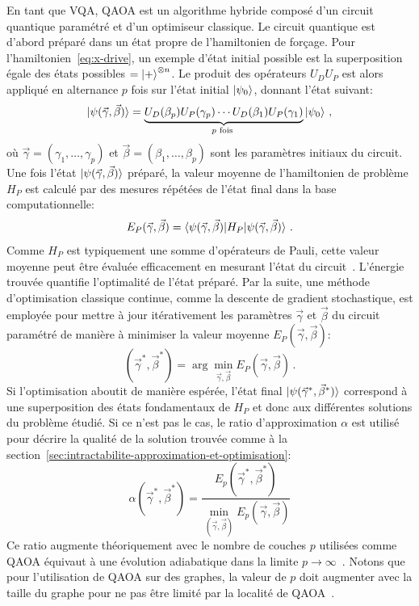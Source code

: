 En tant que VQA, QAOA est un algorithme hybride composé d'un circuit quantique paramétré et d'un optimiseur classique. Le circuit quantique est d'abord préparé dans un état propre de l'hamiltonien de forçage. Pour l'hamiltonien~\ref{eq:x-drive}, un exemple d'état initial possible est la superposition égale des états possibles $= \ket{+}^{\otimes n}$. Le produit des opérateurs $U_{D}U_{P}$ est alors appliqué en alternance $p$ fois sur l'état initial $\ket{\psi_{0}}$, donnant l'état suivant:
\begin{equation}
    \label{eq:final-state}
    \ket{\psi(\vec{\gamma}, \vec{\beta})} = \underbrace{U_D(\beta_p) U_P(\gamma_p) \cdots U_D(\beta_1) U_P(\gamma_1)}_{p \text{ fois }} \ket{\psi_{0}} \,,
\end{equation}
où $\vec{\gamma} = (\gamma_{1}, \dots, \gamma_{p})$ et $\vec{\beta} = (\beta_{1}, \dots, \beta_{p})$ sont les paramètres initiaux du circuit. Une fois l'état $\ket{\psi(\vec{\gamma}, \vec{\beta})}$ préparé, la valeur moyenne de l'hamiltonien de problème $H_{P}$ est calculé par des mesures répétées de l'état final dans la base computationnelle:
\begin{equation}
    E_{P} (\vec{\gamma}, \vec{\beta}) = \braket{ \psi(\vec{\gamma}, \vec{\beta}) | H_{P} | \psi(\vec{\gamma}, \vec{\beta}) } \,.
\end{equation}
Comme $H_{P}$ est typiquement une somme d'opérateurs de Pauli, cette valeur moyenne peut être évaluée efficacement en mesurant l'état du circuit~\cite{nielsenQuantumComputationQuantum2011}. L'énergie trouvée quantifie l'optimalité de l'état préparé. Par la suite, une méthode d'optimisation classique continue, comme la descente de gradient stochastique, est employée pour mettre à jour itérativement les paramètres $\vec{\gamma}$ et $\vec{\beta}$ du circuit paramétré de manière à minimiser la valeur moyenne $E_{P} (\vec{\gamma}, \vec{\beta})$:
\begin{equation}
    (\vec{\gamma}^{*}, \vec{\beta}^{*}) = \arg \min_{{\vec{\gamma}, \vec{\beta}}} E_{P}(\vec{\gamma}, \vec{\beta}) \,.
\end{equation}
Si l'optimisation aboutit de manière espérée, l'état final $\ket{\psi(\vec{\gamma}^{*}, \vec{\beta}^{*})}$ correspond à une superposition des états fondamentaux de $H_{P}$ et donc aux différentes solutions du problème étudié. Si ce n'est pas le cas, le ratio d'approximation $\alpha$ est utilisé pour décrire la qualité de la solution trouvée comme à la section~\ref{sec:intractabilite-approximation-et-optimisation}:
\begin{equation}
    \alpha (\vec{\gamma}^{*}, \vec{\beta}^{*}) = \frac{ E_{p} (\vec{\gamma}^{*}, \vec{\beta}^{*})}{\min_{(\vec{\gamma}, \vec{\beta})} E_{p} (\vec{\gamma}, \vec{\beta}) }
\end{equation}
Ce ratio augmente théoriquement avec le nombre de couches $p$ utilisées comme QAOA équivaut à une évolution adiabatique dans la limite $p \to \infty$~\cite{farhiQuantumApproximateOptimization2014}. Notons que pour l'utilisation de QAOA sur des graphes, la valeur de $p$ doit augmenter avec la taille du graphe pour ne pas être limité par la localité de QAOA~\cite{farhiQuantumApproximateOptimization2020}.

